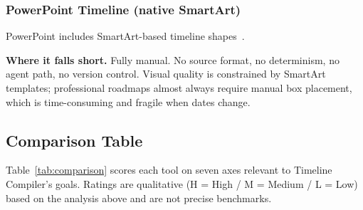 \subsubsection{PowerPoint Timeline (native SmartArt)}

PowerPoint includes SmartArt-based timeline shapes~\cite{powerpoint-timeline}.

\medskip\noindent
\textbf{Where it falls short.}
Fully manual.  No source format, no determinism, no agent path, no
version control.  Visual quality is constrained by SmartArt templates;
professional roadmaps almost always require manual box placement, which
is time-consuming and fragile when dates change.

\subsection{Comparison Table}
\label{sec:comparison-table}

Table~\ref{tab:comparison} scores each tool on seven axes relevant to
Timeline Compiler's goals.
Ratings are qualitative (H = High / M = Medium / L = Low) based on the
analysis above and are not precise benchmarks.


